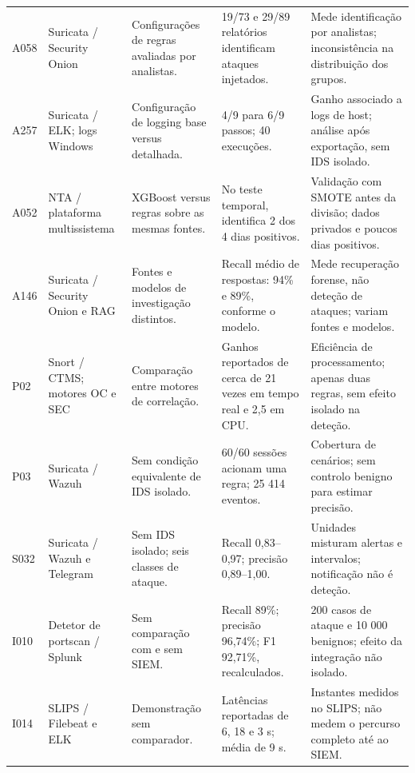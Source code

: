 \documentclass[11pt,a4paper]{article}
\begin{document}
\begin{longtable}{@{}P{1.15cm}P{2.65cm}P{3.0cm}P{3.5cm}P{4.85cm}@{}}
A058\newline\citep{saibersoc2022} & Suricata / Security Onion & Configurações de regras avaliadas por analistas. & 19/73 e 29/89 relatórios identificam ataques injetados. & Mede identificação por analistas; inconsistência na distribuição dos grupos.\\[5pt]
A257\newline\citep{uetz2021} & Suricata / ELK; logs Windows & Configuração de logging base versus detalhada. & 4/9 para 6/9 passos; 40 execuções. & Ganho associado a logs de host; análise após exportação, sem IDS isolado.\\[5pt]
A052\newline\citep{roelofs2024} & NTA / plataforma multissistema & XGBoost versus regras sobre as mesmas fontes. & No teste temporal, identifica 2 dos 4 dias positivos. & Validação com SMOTE antes da divisão; dados privados e poucos dias positivos.\\[5pt]
A146\newline\citep{ragincident2026} & Suricata / Security Onion e RAG & Fontes e modelos de investigação distintos. & Recall médio de respostas: 94\% e 89\%, conforme o modelo. & Mede recuperação forense, não deteção de ataques; variam fontes e modelos.\\[5pt]
P02\newline\citep{sheeraz2024} & Snort / CTMS; motores OC e SEC & Comparação entre motores de correlação. & Ganhos reportados de cerca de 21 vezes em tempo real e 2,5 em CPU. & Eficiência de processamento; apenas duas regras, sem efeito isolado na deteção.\\[5pt]
P03\newline\citep{suryayusra2026} & Suricata / Wazuh & Sem condição equivalente de IDS isolado. & 60/60 sessões acionam uma regra; 25 414 eventos. & Cobertura de cenários; sem controlo benigno para estimar precisão.\\[5pt]
S032\newline\citep{wazuhtelegram2026} & Suricata / Wazuh e Telegram & Sem IDS isolado; seis classes de ataque. & Recall 0,83--0,97; precisão 0,89--1,00. & Unidades misturam alertas e intervalos; notificação não é deteção.\\[5pt]
I010\newline\citep{chandran2026} & Detetor de portscan / Splunk & Sem comparação com e sem SIEM. & Recall 89\%; precisão 96,74\%; F1 92,71\%, recalculados. & 200 casos de ataque e 10 000 benignos; efeito da integração não isolado.\\[5pt]
I014\newline\citep{pattinama2026} & SLIPS / Filebeat e ELK & Demonstração sem comparador. & Latências reportadas de 6, 18 e 3 s; média de 9 s. & Instantes medidos no SLIPS; não medem o percurso completo até ao SIEM.\\[5pt]

\end{longtable}
\end{document}

